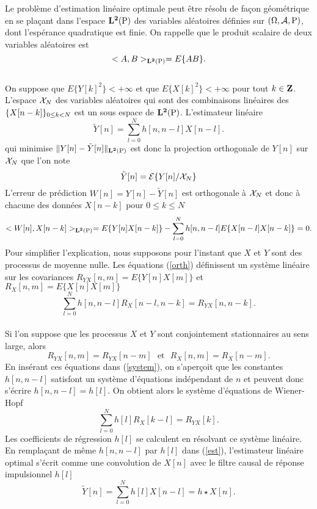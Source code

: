 Le probl\`eme d'estimation lin\'eaire optimale peut \^etre r\'esolu
de fa\c{c}on g\'eom\'etrique en se 
pla\c{c}ant dans l'espace ${\bf L ^ 2 (\rm P)}$ 
des variables al\'eatoires
d\'efinies sur $(\Omega , \cal A , \rm P)$, dont l'esp\'erance
quadratique est finie. On rappelle que le
produit scalaire de deux variables al\'eatoires est
\begin{equation}
<A,B>_{\bf L ^ 2 (\rm P)} = E\{A B\} .
\end{equation}
\\
On suppose que $E\{Y[k]^2\} < +\infty$ 
et que $E\{X[k]^2\} < +\infty$ pour tout $k \in {\bf{Z}}$.
L'espace ${\cal X}_N$ des variables al\'eatoires 
qui sont des combinaisons
lin\'eaires des $\{ X[n-k] \}_{ 0 \leq k < N}$ est un sous espace de ${\bf L ^ 2 (\rm P)}$.
L'estimateur lin\'eaire
\begin{equation}
\label{est}
\tilde Y[n] = \sum_{l=0}^{N} h[n,n-l] X[n-l] .
\end{equation}
qui minimise $\| Y[n] - \tilde Y[n] \|_{\bf L ^ 2 (\rm P)}$ est
donc la projection orthogonale de $Y[n]$ sur ${\cal X}_N$
que l'on note
\[
\tilde Y[n] = {\cal E} \{Y[n] {/} {\cal X}_N \}
\]
L'erreur de pr\'ediction $W [n] = Y[n] - \tilde Y[n]$
est orthogonale \`a ${\cal X}_N$ et donc \`a chacune des donn\'ees $X[n-k]$
pour $0 \leq k \leq N$
\begin{equation}
\label{orth}
<W [n] , X[n-k] > _{\bf L ^ 2 (\rm P)} = 
E\{Y[n] X[n-k]\} - 
\sum_{l=0}^{N} h[n,n-l] E \{ X[n-l] X[n-k] \} = 0 .
\end{equation}
Pour simplifier l'explication, nous supposons pour l'instant
que $X$ et $Y$ sont des processus de moyenne nulle.
Les \'equations (\ref{orth}) d\'efinissent
un syst\`eme lin\'eaire sur les covariances
$R_{YX} [n,m] = E\{Y[n] X[m]\}$ et
$R_{X} [n,m] = E\{X[n] X[m]\}$ 
\begin{equation}
\label{system}
\sum_{l=0}^{N} h[n,n-l] R_X [n-l,n-k] = R_{YX} [n,n-k] .
\end{equation}
\\
Si l'on suppose que les processus $X$ et $Y$ sont conjointement
stationnaires au sens large, alors 
\[
R_{YX} [n,m]= R_{YX} [n-m] ~~~\mbox{et}~~~
R_{X} [n,m]= R_{X} [n-m] .
\]
En ins\'erant ces \'equations dans (\ref{system}), 
on s'aper\c{c}oit que les constantes
$h[n,n-l]$ satisfont un syst\`eme d'\'equations ind\'ependant
de $n$ et peuvent donc s'\'ecrire $h[n,n-l] = h[l]$.
On obtient alors le syst\`eme d'\'equations de Wiener-Hopf
\begin{equation}
\sum_{l=0}^{N} h[l] R_X [k-l] = R_{YX} [k] .
\end{equation}
Les coefficients de r\'egression $h[l]$ se calculent en
r\'esolvant ce syst\`eme lin\'eaire.
En rempla\c{c}ant de m\^eme $h[n,n-l]$ par $h[l]$ dans (\ref{est}), 
l'estimateur lin\'eaire optimal s'\'ecrit comme une
convolution de $X[n]$ avec le filtre causal de r\'eponse 
impulsionnel $h[l]$
\begin{equation}
\label{filtre-wiener}
\tilde Y[n] = \sum_{l=0}^{N} h[l] X[n-l] = h \star X [n] .
\end{equation}

